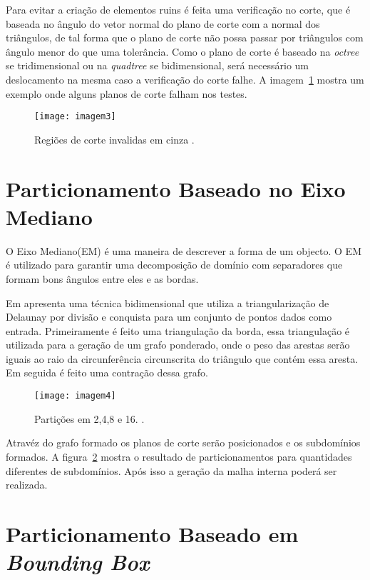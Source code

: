 Para evitar a criação de elementos ruins é feita uma verificação no corte, que é baseada no ângulo do vetor normal do plano de corte com a normal dos triângulos, de tal forma que o plano de corte não possa passar por triângulos com ângulo menor do que uma tolerância. Como o plano de corte é baseado na \textit{octree} se tridimensional ou na \textit{quadtree} se bidimensional, será necessário um deslocamento na mesma caso a verificação do corte falhe. A imagem~\ref{fig:imagem3} mostra um exemplo onde alguns planos de corte falham nos testes.

 \begin{figure}[htbp]
     \centering
     \texttt{[image: imagem3]}
     \caption{Regiões de corte invalidas em cinza \cite{bib:Larwood03}.}
     \label{fig:imagem3}
 \end{figure}

\section{Particionamento Baseado no Eixo Mediano}

O Eixo Mediano(EM) é uma maneira de descrever a forma de um objecto. O EM é utilizado para garantir uma decomposição de domínio com separadores que formam bons ângulos entre eles e as bordas. 

Em \cite{bib:Leonidas06} apresenta uma técnica bidimensional que utiliza a triangularização de Delaunay por divisão e conquista para um conjunto de pontos dados como entrada. Primeiramente é feito uma triangulação da borda, essa triangulação é utilizada para a geração de um grafo ponderado, onde o peso das arestas serão iguais ao raio da circunferência circunscrita do triângulo que contém essa aresta. Em seguida é feito uma contração dessa grafo. 

 \begin{figure}[htbp]
     \centering
     \texttt{[image: imagem4]}
     \caption{Partições em 2,4,8 e 16. \cite{bib:Leonidas06}.}
     \label{fig:imagem4}
 \end{figure}

Atravéz do grafo formado os planos de corte serão posicionados e os subdomínios formados. A figura~\ref{fig:imagem4} mostra o resultado de particionamentos para quantidades diferentes de subdomínios. Após isso a geração da malha interna poderá ser realizada.

\section{Particionamento Baseado em \textit{Bounding Box}}

